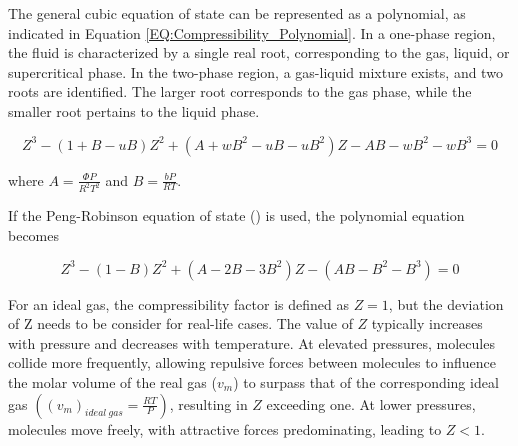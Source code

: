 \documentclass[../Article_Model_Parameters.tex]{subfiles}
\begin{document}
	\begin{table}[h!]
		\centering
		\caption{Parameters for Popular Cubic EoS}
		\label{tab:Popular_Cubic_EoS_alpha}
	\end{table}
	
	The general cubic equation of state can be represented as a polynomial, as indicated in Equation \ref{EQ:Compressibility_Polynomial}. In a one-phase region, the fluid is characterized by a single real root, corresponding to the gas, liquid, or supercritical phase. In the two-phase region, a gas-liquid mixture exists, and two roots are identified. The larger root corresponds to the gas phase, while the smaller root pertains to the liquid phase.
	
	{\footnotesize
		\begin{equation}
			\label{EQ:Compressibility_Polynomial}
			Z^3 - (1+B-uB)Z^2+(A+wB^2-uB-uB^2)Z - AB - wB^2 - wB^3 = 0
	\end{equation} }

	where $A=\frac{\Phi P}{R^2T^2}$ and $B=\frac{bP}{RT}$.
	
	If the Peng-Robinson equation of state (\citet{Peng1976}) is used, the polynomial equation becomes
	
	{\footnotesize
	\begin{equation}
		\label{EQ:Peng_Robinson_Polynomial}
		Z^3 - (1-B)Z^2+(A-2B-3B^2)Z -(AB-B^2-B^3) = 0
	\end{equation} }
	
	For an ideal gas, the compressibility factor is defined as $Z = 1$, but the deviation of Z needs to be consider for real-life cases. The value of $Z$ typically increases with pressure and decreases with temperature. At elevated pressures, molecules collide more frequently, allowing repulsive forces between molecules to influence the molar volume of the real gas ($v_m$) to surpass that of the corresponding ideal gas $\left( \left(v_m\right)_{ideal~gas} = \frac{RT}{P} \right)$, resulting in $Z$ exceeding one. At lower pressures, molecules move freely, with attractive forces predominating, leading to $Z < 1$.
	
\end{document}
